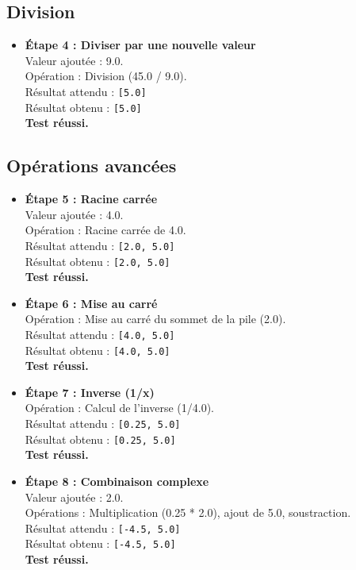 \documentclass[12pt, a4paper, onecolumn]{article}
\begin{document}
\subsection{Division}
\begin{itemize}
	\item \textbf{Étape 4 : Diviser par une nouvelle valeur} \\
	Valeur ajoutée : 9.0. \\
	Opération : Division (45.0 / 9.0). \\
	Résultat attendu : \texttt{[5.0]} \\
	Résultat obtenu : \texttt{[5.0]} \\
	\textbf{Test réussi.}
\end{itemize}

\subsection{Opérations avancées}
\begin{itemize}
	\item \textbf{Étape 5 : Racine carrée} \\
	Valeur ajoutée : 4.0. \\
	Opération : Racine carrée de 4.0. \\
	Résultat attendu : \texttt{[2.0, 5.0]} \\
	Résultat obtenu : \texttt{[2.0, 5.0]} \\
	\textbf{Test réussi.}
	\\
	\item \textbf{Étape 6 : Mise au carré} \\
	Opération : Mise au carré du sommet de la pile (2.0). \\
	Résultat attendu : \texttt{[4.0, 5.0]} \\
	Résultat obtenu : \texttt{[4.0, 5.0]} \\
	\textbf{Test réussi.}
	\\
	\item \textbf{Étape 7 : Inverse (1/x)} \\
	Opération : Calcul de l'inverse (1/4.0). \\
	Résultat attendu : \texttt{[0.25, 5.0]} \\
	Résultat obtenu : \texttt{[0.25, 5.0]} \\
	\textbf{Test réussi.}
	\\
	\item \textbf{Étape 8 : Combinaison complexe} \\
	Valeur ajoutée : 2.0. \\
	Opérations : Multiplication (0.25 * 2.0), ajout de 5.0, soustraction. \\
	Résultat attendu : \texttt{[-4.5, 5.0]} \\
	Résultat obtenu : \texttt{[-4.5, 5.0]} \\
	\textbf{Test réussi.}
\end{itemize}
\end{document}
